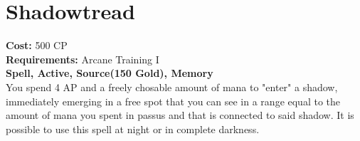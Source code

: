 \section{Shadowtread}
\textbf{Cost:} 500 CP\\
\textbf{Requirements:}  Arcane Training I\\
\textbf{Spell, Active, Source(150 Gold), Memory}\\
You spend 4 AP and a freely chosable amount of mana to "enter" a shadow, immediately emerging in a free spot that you can see in a range equal to the amount of mana you spent in passus and that is connected to said shadow. It is possible to use this spell at night or in complete darkness.\\